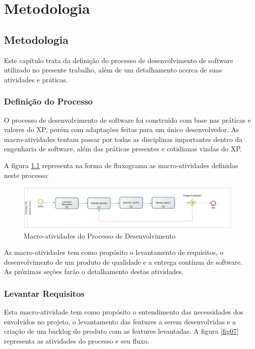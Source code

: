 \part{Metodologia}

\chapter[Metodologia]{Metodologia}

Este capítulo trata da definição do processo de desenvolvimento de software utilizado no presente trabalho, além de um detalhamento acerca de suas atividades e práticas.

\section{Definição do Processo}

O processo de desenvolvimento de software foi construído com base nas práticas e valores do XP, porém com adaptações feitas para um único desenvolvedor. As macro-atividades tentam passar por todas as disciplinas importantes dentro da engenharia de software, além das práticas presentes e cotidianas vindas do XP.

A figura \ref{fig06} representa na forma de fluxograma as macro-atividades definidas neste processo:

\begin{figure}[ht]
	\centering
	\includegraphics[keepaspectratio=true,scale=0.9, width=\textwidth]{figuras/fig06.eps}
	\caption{Macro-atividades do Processo de Desenvolvimento}
	\label{fig06}
\end{figure}

As macro-atividades tem como propósito o levantamento de requisitos, o desenvolvimento de um produto de qualidade e a entrega contínua de software. As próximas seções farão o detalhamento destas atividades.

\section{Levantar Requisitos}

Esta macro-atividade tem como propósito o entendimento das necessidades dos envolvidos no projeto, o levantamento das features a serem desenvolvidas e a criação de um backlog do produto com as features levantadas. A figura \ref{fig07} representa as atividades do processo e seu fluxo.

